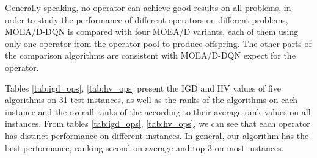 \documentclass[journal]{IEEEtran}
\begin{document}
Generally speaking, no operator can achieve good results on all problems, in order to study the performance of different operators on different problems, MOEA/D-DQN is compared with four MOEA/D variants, each of them using only one operator from the operator pool to produce offspring. The other parts of the comparison algorithms are consistent with MOEA/D-DQN expect for the operator.

Tables \ref{tab:igd_ops}, \ref{tab:hv_ops} present the IGD and HV values of five algorithms on 31 test instances, as well as the ranks of the algorithms on each instance and the overall ranks of the according to their average rank values on all instances.
From tables \ref{tab:igd_ops}, \ref{tab:hv_ops}, we can see that each operator has distinct performance on different instances. In general, our algorithm has the best performance, ranking second on average and top 3 on most instances.
\end{document}
